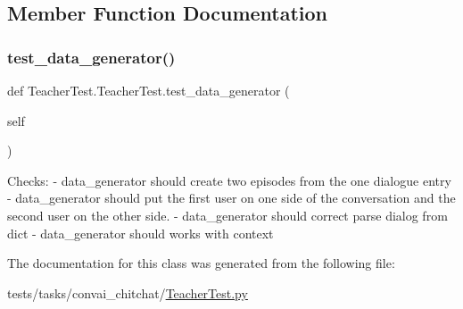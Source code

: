 \subsection{Member Function Documentation}
\mbox{\label{classTeacherTest_1_1TeacherTest_aeb5a6c83bfa0e5eb8d8fad13789421aa}} 
\subsubsection{\texorpdfstring{test\+\_\+data\+\_\+generator()}{test\_data\_generator()}}
{\footnotesize\ttfamily def Teacher\+Test.\+Teacher\+Test.\+test\+\_\+data\+\_\+generator (\begin{DoxyParamCaption}\item[{}]{self }\end{DoxyParamCaption})}

\begin{DoxyVerb}Checks:
- data_generator should create two episodes from the one dialogue entry
- data_generator should put the first user on one side of the
  conversation and the second user on the other side.
- data_generator should correct parse dialog from dict
- data_generator should works with context
\end{DoxyVerb}
 

The documentation for this class was generated from the following file\+:\begin{DoxyCompactItemize}
\item 
tests/tasks/convai\+\_\+chitchat/\hyperlink{TeacherTest_8py}{Teacher\+Test.\+py}\end{DoxyCompactItemize}
